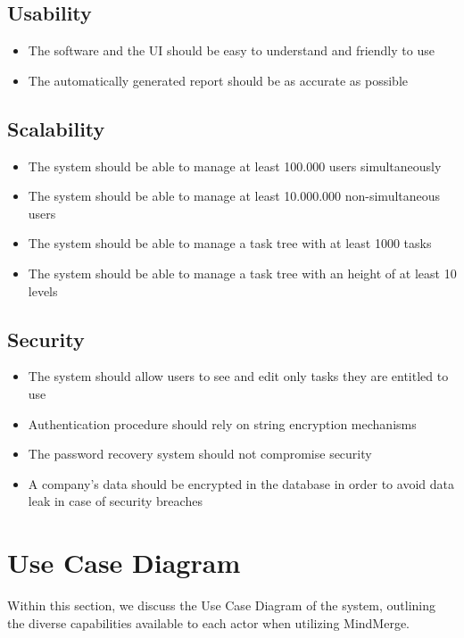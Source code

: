 \documentclass{article}
\begin{document}
\subsection{Usability}
\begin{itemize}
    \item The software and the UI should be easy to understand and friendly to use
    \item The automatically generated report should be as accurate as possible
\end{itemize}

\subsection{Scalability}
\begin{itemize}
    \item The system should be able to manage at least 100.000 users simultaneously
    \item The system should be able to manage at least 10.000.000 non-simultaneous users
    \item The system should be able to manage a task tree with at least 1000 tasks
    \item The system should be able to manage a task tree with an height of at least 10 levels
\end{itemize}

\subsection{Security}
\begin{itemize}
    \item The system should allow users to see and edit only tasks they are entitled to use
    \item Authentication procedure should rely on string encryption mechanisms
    \item The password recovery system should not compromise security
    \item A company's data should be encrypted in the database in order to avoid data leak in case of security breaches
\end{itemize}
\pagebreak

\section{Use Case Diagram}
Within this section, we discuss the Use Case Diagram of the system, outlining the diverse capabilities available to each actor when utilizing MindMerge.
\end{document}
